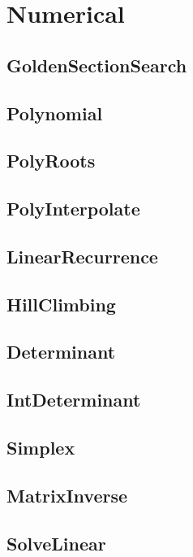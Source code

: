 \chapter{Numerical}

\section{GoldenSectionSearch}
\section{Polynomial}
\section{PolyRoots}
\section{PolyInterpolate}
\section{LinearRecurrence}
\section{HillClimbing}
\section{Determinant}
\section{IntDeterminant}
\section{Simplex}
\section{MatrixInverse}
\section{SolveLinear}
